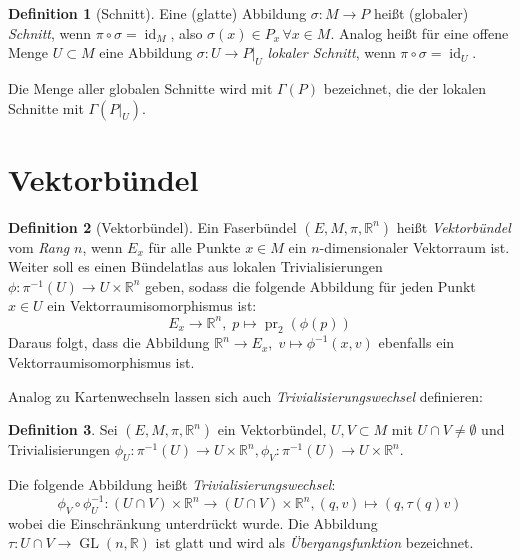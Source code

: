 \documentclass[a4paper]{scrreprt}
\numberwithin{equation}{chapter}
\DeclareMathOperator{\id}{id}
\DeclareMathOperator{\GL}{GL}
\DeclareMathOperator{\pr}{pr}
\newcommand{\R}{\mathbb{R}}
\theoremstyle{definition}
\newtheorem{defn}{Definition}[section]
\begin{document}
		\begin{defn}[Schnitt]
			Eine (glatte) Abbildung $\sigma\colon M\rightarrow P$ heißt (globaler) \emph{Schnitt}, wenn $\pi\circ\sigma=\id_M$, also $\sigma(x)\in P_x\, \forall x\in M$. Analog heißt für eine offene Menge $U\subset M$ eine Abbildung $\sigma\colon U\rightarrow P\vert_U$ \emph{lokaler Schnitt}, wenn $\pi\circ\sigma=\id_U$.

			Die Menge aller globalen Schnitte wird mit $\Gamma(P)$ bezeichnet, die der lokalen Schnitte mit $\Gamma(P\vert_U)$.
		\end{defn}
	\section{Vektorbündel}
		\begin{defn}[Vektorbündel]
				Ein Faserbündel $(E,M,\pi,\R^n)$ heißt \emph{Vektorbündel} vom \emph{Rang} $n$, wenn $E_x$ für alle Punkte $x\in M$ ein $n$-dimensionaler Vektorraum ist. Weiter soll es einen Bündelatlas aus lokalen Trivialisierungen ${\phi\colon \pi^{-1}(U)\rightarrow U\times \R^n}$ geben, sodass die folgende Abbildung für jeden Punkt $x\in U$ ein Vektorraumisomorphismus ist:
				\begin{equation*}
					E_x\rightarrow \R^n,\; p\mapsto \pr_2(\phi(p))
				\end{equation*}
			Daraus folgt, dass die Abbildung ${\R^n\rightarrow E_x,\; v\mapsto \phi^{-1}(x,v)}$ ebenfalls ein Vektorraumisomorphismus ist.
		\end{defn}
		Analog zu Kartenwechseln lassen sich auch \emph{Trivialisierungswechsel} definieren:
		\begin{defn}
			Sei $(E,M,\pi,\R^n)$ ein Vektorbündel, $U,V\subset M$ mit $U\cap V\neq\emptyset$ und Trivialisierungen ${\phi_U\colon \pi^{-1}(U)\rightarrow U\times \R^n}, {\phi_V\colon \pi^{-1}(U)\rightarrow U\times \R^n}$.

			Die folgende Abbildung heißt \emph{Trivialisierungswechsel}:
			\begin{equation*}
				\phi_V\circ\phi_U^{-1}\colon (U\cap V)\times \R^n\rightarrow (U\cap V)\times \R^n, (q,v)\mapsto (q,\tau(q)v)
			\end{equation*}
			wobei die Einschränkung unterdrückt wurde. Die Abbildung $\tau\colon U\cap V\rightarrow \GL(n,\R)$ ist glatt und wird als \emph{Übergangsfunktion} bezeichnet.
		\end{defn}
\end{document}
